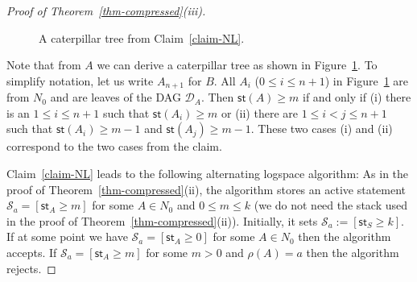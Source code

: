 \documentclass[a4paper,UKenglish,cleveref, autoref, thm-restate, numberwithinsect]{lipics-v2021}
\newcommand{\hs}{\mathsf{st}}
\begin{document}
\begin{proof}[Proof of Theorem~\ref{thm-compressed}(iii)]
 \begin{figure}[t]
\caption{\label{fig-caterpillar} A caterpillar tree from Claim~\ref{claim-NL}.}
\end{figure}


\begin{claimproof}
Note that from $A$ we can derive a caterpillar tree as shown in Figure~\ref{fig-caterpillar}. 
To simplify notation, let us write $A_{n+1}$ for $B$. All $A_i$ ($0 \le i \le n+1$) in 
Figure~\ref{fig-caterpillar} are from $N_0$ and are leaves of the DAG $\mathcal{D}_A$.
 Then $\hs(A) \ge m$ if and only if (i) there 
is an $1 \le i \le n+1$ such that $\hs(A_i) \ge m$ or (ii) there are $1 \le i < j \le n+1$ such that $\hs(A_i) \ge m-1$ 
and  $\hs(A_j) \ge m-1$. These two cases (i) and (ii) correspond to the two cases from the claim.
\end{claimproof}

\noindent
Claim~\ref{claim-NL}  leads to the following alternating logspace algorithm: 
As in the proof of Theorem~\ref{thm-compressed}(ii), the algorithm stores an active statement $\mathcal{S}_a = [\hs_A \geq m]$
for some $A \in N_0$ and $0 \le m \le k$ (we do not need the stack used in the proof of Theorem~\ref{thm-compressed}(ii)).
Initially, it sets $\mathcal{S}_a := [\hs_S \ge k]$. If at some point we have $\mathcal{S}_a = [\hs_A \geq 0]$ for some
$A \in N_0$ then the algorithm accepts. If $\mathcal{S}_a = [\hs_A \geq m]$ for some $m>0$ and 
$\rho(A) = a$ then the algorithm rejects.


\end{proof}
\end{document}
